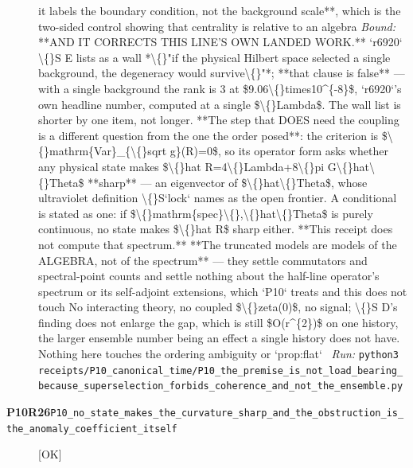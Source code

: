 \begin{description}
it labels the boundary condition, not the background scale**, which is the two-sided control showing that centrality is relative to an algebra
 \emph{Bound:}  **AND IT CORRECTS THIS LINE'S OWN LANDED WORK.** `r6920` \textbackslash\{\}S E lists as a wall *\textbackslash\{\}"if the physical Hilbert space selected a single background, the degeneracy would survive\textbackslash\{\}"*; **that clause is false** --- with a single background the rank is 3 at \$9.06\textbackslash\{\}times10\textasciicircum{}\{-8\}\$, `r6920`'s own headline number, computed at a single \$\textbackslash\{\}Lambda\$.  The wall list is shorter by one item, not longer.   **The step that DOES need the coupling is a different question from the one the order posed**: the criterion is \$\textbackslash\{\}mathrm\{Var\}\_\{\textbackslash\{\}sqrt g\}(R)=0\$, so its operator form asks whether any physical state makes \$\textbackslash\{\}hat R=4\textbackslash\{\}Lambda+8\textbackslash\{\}pi G\textbackslash\{\}hat\textbackslash\{\}Theta\$ **sharp** --- an eigenvector of \$\textbackslash\{\}hat\textbackslash\{\}Theta\$, whose ultraviolet definition \textbackslash\{\}S`lock` names as the open frontier.  A conditional is stated as one: if \$\textbackslash\{\}mathrm\{spec\}\textbackslash\{\},\textbackslash\{\}hat\textbackslash\{\}Theta\$ is purely continuous, no state makes \$\textbackslash\{\}hat R\$ sharp either.  **This receipt does not compute that spectrum.**  **The truncated models are models of the ALGEBRA, not of the spectrum** --- they settle commutators and spectral-point counts and settle nothing about the half-line operator's spectrum or its self-adjoint extensions, which `P10` treats and this does not touch  No interacting theory, no coupled \$\textbackslash\{\}zeta(0)\$, no signal; \textbackslash\{\}S D's finding does not enlarge the gap, which is still \$O(r\textasciicircum{}\{2\})\$ on one history, the larger ensemble number being an effect a single history does not have.  Nothing here touches the ordering ambiguity or `prop:flat`
\ \emph{Run:} \texttt{python3 receipts/P10\_canonical\_time/P10\_the\_premise\_is\_not\_load\_bearing\_because\_superselection\_forbids\_coherence\_and\_not\_the\_ensemble.py}
\item[\rcptlabel{P10_no_state_makes_the_curvature_sharp_and_the_obstruction_is_the_anomaly_coefficient_itself}{P10R26}\textbf{P10R26}\quad\texttt{P10\_no\_state\_makes\_the\_curvature\_sharp\_and\_the\_obstruction\_is\_the\_anomaly\_coefficient\_itself}]\hfill\textsf{[OK]}\\

\end{description}
